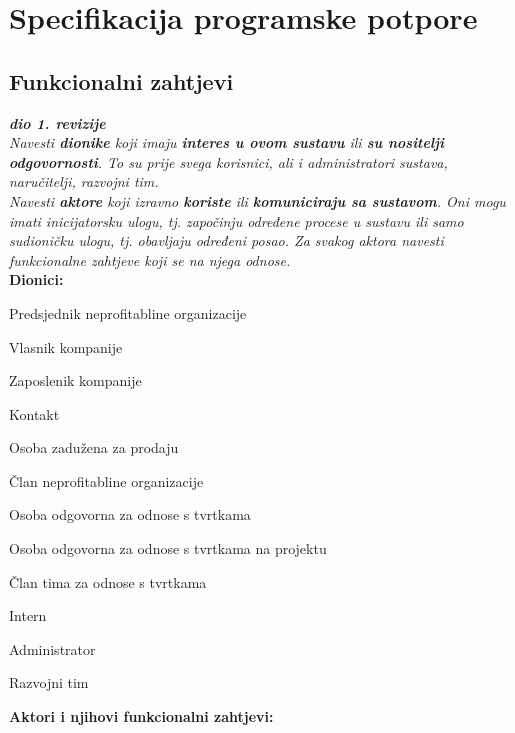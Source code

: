 \chapter{Specifikacija programske potpore}
		
	\section{Funkcionalni zahtjevi}
			
			\textbf{\textit{dio 1. revizije}}\\

			\textit{Navesti \textbf{dionike} koji imaju \textbf{interes u ovom sustavu} ili \textbf{su nositelji odgovornosti}. To su prije svega korisnici, ali i administratori sustava, naručitelji, razvojni tim.}\\

			\textit{Navesti \textbf{aktore} koji izravno \textbf{koriste} ili \textbf{komuniciraju sa sustavom}. Oni mogu imati inicijatorsku ulogu, tj. započinju određene procese u sustavu ili samo sudioničku ulogu, tj. obavljaju određeni posao. Za svakog aktora navesti funkcionalne zahtjeve koji se na njega odnose.}\\


			\noindent \textbf{Dionici:}
			
			\begin{packed_enum}
				
				\item Predsjednik neprofitabline organizacije
				\item Vlasnik kompanije
				\item Zaposlenik kompanije
					\item Kontakt
					\item Osoba zadužena za prodaju
				\item Član neprofitabline organizacije
					\item Osoba odgovorna za odnose s tvrtkama
					\item Osoba odgovorna za odnose s tvrtkama na projektu
					\item Član tima za odnose s tvrtkama
					\item Intern
				\item Administrator
				\item Razvojni tim
				
			\end{packed_enum}
			
			\noindent \textbf{Aktori i njihovi funkcionalni zahtjevi:}
			

